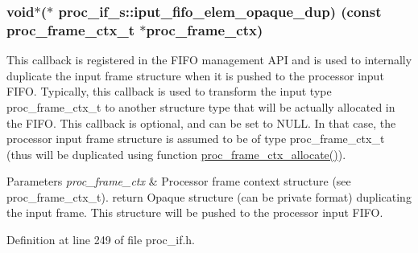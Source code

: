 \subsubsection[{\texorpdfstring{iput\+\_\+fifo\+\_\+elem\+\_\+opaque\+\_\+dup}{iput_fifo_elem_opaque_dup}}]{\setlength{\rightskip}{0pt plus 5cm}void$\ast$($\ast$ proc\+\_\+if\+\_\+s\+::iput\+\_\+fifo\+\_\+elem\+\_\+opaque\+\_\+dup) (const {\bf proc\+\_\+frame\+\_\+ctx\+\_\+t} $\ast$proc\+\_\+frame\+\_\+ctx)}\hypertarget{structproc__if__s_a558cec57df436699d4154775894f2313}{}\label{structproc__if__s_a558cec57df436699d4154775894f2313}
This callback is registered in the F\+I\+FO management A\+PI and is used to internally duplicate the input frame structure when it is pushed to the processor input F\+I\+FO. Typically, this callback is used to transform the input type proc\+\_\+frame\+\_\+ctx\+\_\+t to another structure type that will be actually allocated in the F\+I\+FO. This callback is optional, and can be set to N\+U\+LL. In that case, the processor input frame structure is assumed to be of type proc\+\_\+frame\+\_\+ctx\+\_\+t (thus will be duplicated using function \textquotesingle{}\hyperlink{proc__if_8c_a26df07b260850afd03ec73572608a034}{proc\+\_\+frame\+\_\+ctx\+\_\+allocate()}\textquotesingle{}). 
\begin{DoxyParams}{Parameters}
{\em proc\+\_\+frame\+\_\+ctx} & Processor frame context structure (see proc\+\_\+frame\+\_\+ctx\+\_\+t). return Opaque structure (can be private format) duplicating the input frame. This structure will be pushed to the processor input F\+I\+FO. \\
\hline
\end{DoxyParams}


Definition at line 249 of file proc\+\_\+if.\+h.

